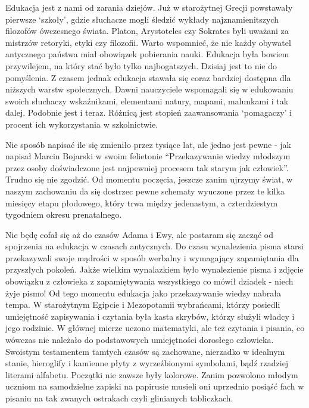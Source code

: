 \documentclass{article}
\begin{document}
\par
Edukacja jest z nami od zarania dziejów. Już w starożytnej Grecji powstawały pierwsze ‘szkoły’, gdzie słuchacze mogli śledzić wykłady najznamienitszych filozofów ówczesnego świata. Platon, Arystoteles czy Sokrates byli uważani za mistrzów retoryki, etyki czy filozofii. Warto wspomnieć, że nie każdy obywatel antycznego państwa miał obowiązek pobierania nauki. Edukacja była bowiem przywilejem, na który stać było tylko najbogatszych. Dzisiaj jest to nie do pomyślenia. Z czasem jednak edukacja stawała się coraz bardziej dostępna dla niższych warstw społecznych. Dawni nauczyciele wspomagali się w edukowaniu swoich słuchaczy wskaźnikami, elementami natury, mapami, malunkami i tak dalej. Podobnie jest i teraz. Różnicą jest stopień zaawansowania ‘pomagaczy’ i procent ich wykorzystania w szkolnictwie.
\par
Nie sposób napisać ile się zmieniło przez tysiące lat, ale jedno jest pewne - jak napisał Marcin Bojarski w swoim felietonie\cite{ref1} “Przekazywanie wiedzy młodszym przez osoby doświadczone jest najpewniej procesem tak starym jak człowiek”. Trudno się nie zgodzić. Od momentu poczęcia, jeszcze zanim ujrzymy świat, w naszym zachowaniu da się dostrzec pewne schematy wyuczone przez te kilka miesięcy etapu płodowego, który trwa między jedenastym, a czterdziestym tygodniem okresu prenatalnego.
\par
Nie będę cofał się aż do czasów Adama i Ewy, ale postaram się zacząć od spojrzenia na edukacja w czasach antycznych. Do czasu wynalezienia pisma starsi przekazywali swoje mądrości w sposób werbalny i wymagający zapamiętania dla przyszłych pokoleń. Jakże wielkim wynalazkiem było wynalezienie pisma i zdjęcie obowiązku z człowieka z zapamiętywania wszystkiego co mówił dziadek - niech żyje pismo! Od tego momentu edukacja jako przekazywanie wiedzy nabrała tempa. W starożytnym Egipcie i Mezopotamii wybrańcami, którzy posiedli umiejętność zapisywania i czytania była kasta skrybów, którzy służyli władcy i jego rodzinie. W głównej mierze uczono matematyki, ale też czytania i pisania, co wówczas nie należało do podstawowych umiejętności dorosłego człowieka. Swoistym testamentem tamtych czasów są zachowane, nierzadko w idealnym stanie, hieroglify i kamienne płyty z wyrzeźbionymi symbolami, bądź rzadziej literami alfabetu. Początki nie zawsze były kolorowe. Zanim pozwolono młodym uczniom na samodzielne zapiski na papirusie musieli oni uprzednio posiąść fach w pisaniu na tak zwanych ostrakach czyli glinianych tabliczkach.
\par
\end{document}
